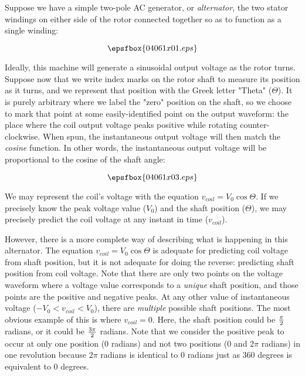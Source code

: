 

Suppose we have a simple two-pole AC generator, or {\it alternator}, the two stator windings on either side of the rotor connected together so as to function as a single winding:

$$\epsfbox{04061x01.eps}$$

Ideally, this machine will generate a sinusoidal output voltage as the rotor turns.  Suppose now that we write index marks on the rotor shaft to measure its position as it turns, and we represent that position with the Greek letter "Theta" ($\Theta$).  It is purely arbitrary where we label the "zero" position on the shaft, so we choose to mark that point at some easily-identified point on the output waveform: the place where the coil output voltage peaks positive while rotating counter-clockwise.  When spun, the instantaneous output voltage will then match the {\it cosine} function.  In other words, the instantaneous output voltage will be proportional to the cosine of the shaft angle:

$$\epsfbox{04061x03.eps}$$

We may represent the coil's voltage with the equation $v_{coil} = V_0 \cos \Theta$.  If we precisely know the peak voltage value ($V_0$) and the shaft position ($\Theta$), we may precisely predict the coil voltage at any instant in time ($v_{coil}$).

However, there is a more complete way of describing what is happening in this alternator.  The equation $v_{coil} = V_0 \cos \Theta$ is adequate for predicting coil voltage from shaft position, but it is not adequate for doing the reverse: predicting shaft position from coil voltage.  Note that there are only two points on the voltage waveform where a voltage value corresponds to a {\it unique} shaft position, and those points are the positive and negative peaks.  At any other value of instantaneous voltage ($-V_0 < v_{coil} < V_0$), there are {\it multiple} possible shaft positions.  The most obvious example of this is where $v_{coil} = 0$.  Here, the shaft position could be $\pi \over 2$ radians, or it could be ${3 \pi} \over 2$ radians.  Note that we consider the positive peak to occur at only one position (0 radians) and not two positions (0 and $2 \pi$ radians) in one revolution because $2 \pi$ radians is identical to 0 radians just as 360 degrees is equivalent to 0 degrees.

